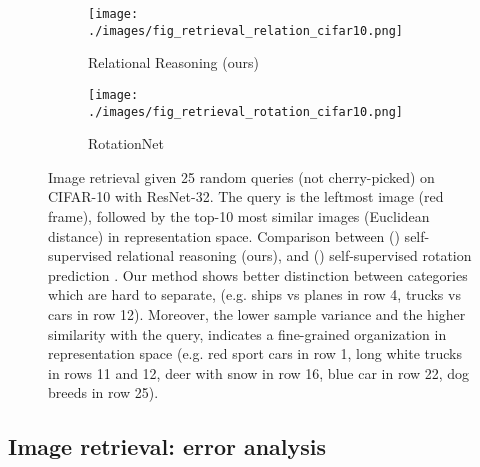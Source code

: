 \documentclass{article}
\begin{document}
\begin{figure}[H]
    \begin{subfigure}[t]{0.5\textwidth}
        \centering
        \texttt{[image: ./images/fig\_retrieval\_relation\_cifar10.png]}
        \caption{Relational Reasoning (ours)}
        \label{fig:retrieval-relation}
    \end{subfigure}
    \begin{subfigure}[t]{0.5\textwidth}
        \centering
        \texttt{[image: ./images/fig\_retrieval\_rotation\_cifar10.png]}
        \caption{RotationNet}
        \label{fig:retrieval-rotation}
    \end{subfigure}
    \caption{Image retrieval given 25 random queries (not cherry-picked) on CIFAR-10 with ResNet-32. The query is the leftmost image (red frame), followed by the top-10 most similar images (Euclidean distance) in representation space. Comparison between () self-supervised relational reasoning (ours), and () self-supervised rotation prediction \citep{gidaris2018unsupervised}. Our method shows better distinction between categories which are hard to separate, (e.g. ships vs planes in row 4, trucks vs cars in row 12). Moreover, the lower sample variance and the higher similarity with the query, indicates a fine-grained organization in representation space (e.g. red sport cars in row 1, long white trucks in rows 11 and 12, deer with snow in row 16, blue car in row 22, dog breeds in row 25).}
    \label{fig:retrieval}
\end{figure}

\subsection{Image retrieval: error analysis}\label{appendix:additional_retrieval_error}
\FloatBarrier
\end{document}
